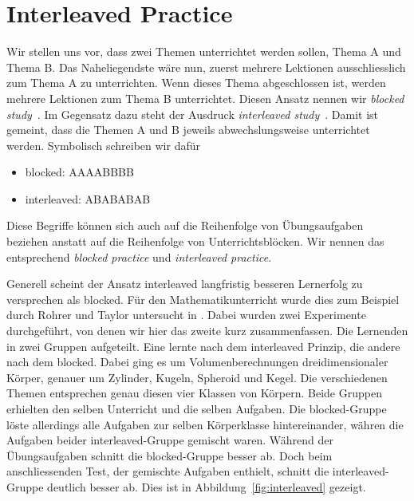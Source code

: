 \section{Interleaved Practice}
Wir stellen uns vor, dass zwei Themen unterrichtet werden sollen, Thema A und Thema B.
Das Naheliegendste wäre nun, zuerst mehrere Lektionen ausschliesslich zum Thema A zu unterrichten.
Wenn dieses Thema abgeschlossen ist, werden mehrere Lektionen zum Thema B unterrichtet.
Diesen Ansatz nennen wir \textit{blocked study}~\cite{Carvalho2014}.
Im Gegensatz dazu steht der Ausdruck \textit{interleaved study}~\cite{Carvalho2014}.
Damit ist gemeint, dass die Themen A und B jeweils abwechslungsweise unterrichtet werden.
Symbolisch schreiben wir dafür
\begin{itemize}
	\item blocked: AAAABBBB
	\item interleaved: ABABABAB
\end{itemize}
Diese Begriffe können sich auch auf die Reihenfolge von Übungsaufgaben beziehen anstatt auf die Reihenfolge von Unterrichtsblöcken.
Wir nennen das entsprechend \textit{blocked practice} und \textit{interleaved practice}.

Generell scheint der Ansatz \glqq{}interleaved\grqq{} langfristig besseren Lernerfolg zu versprechen als \glqq{}blocked\grqq{}.
Für den Mathematikunterricht wurde dies zum Beispiel durch Rohrer und Taylor untersucht in \cite{Rohrer2007}.
Dabei wurden zwei Experimente durchgeführt, von denen wir hier das zweite kurz zusammenfassen.
Die Lernenden in zwei Gruppen aufgeteilt.
Eine lernte nach dem \glqq{}interleaved\grqq{} Prinzip, die andere nach dem \glqq{}blocked\grqq{}.
Dabei ging es um Volumenberechnungen dreidimensionaler Körper, genauer um Zylinder, Kugeln, Spheroid und Kegel.
Die verschiedenen Themen entsprechen genau diesen vier Klassen von Körpern.
Beide Gruppen erhielten den selben Unterricht und die selben Aufgaben.
Die \glqq{}blocked\grqq{}-Gruppe löste allerdings alle Aufgaben zur selben Körperklasse hintereinander, währen die Aufgaben beider \glqq{}interleaved\grqq{}-Gruppe gemischt waren.
Während der Übungsaufgaben schnitt die \glqq{}blocked\grqq{}-Gruppe besser ab.
Doch beim anschliessenden Test, der gemischte Aufgaben enthielt, schnitt die \glqq{}interleaved\grqq{}-Gruppe deutlich besser ab.
Dies ist in Abbildung~\ref{fig:interleaved} gezeigt.

